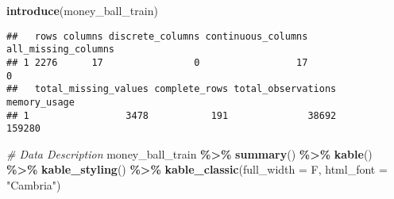 \documentclass[
]{article}
\newenvironment{Shaded}{\begin{snugshade}}{\end{snugshade}}
\newcommand{\AttributeTok}[1]{\textcolor[rgb]{0.13,0.29,0.53}{#1}}
\newcommand{\CommentTok}[1]{\textcolor[rgb]{0.56,0.35,0.01}{\textit{#1}}}
\newcommand{\FunctionTok}[1]{\textcolor[rgb]{0.13,0.29,0.53}{\textbf{#1}}}
\newcommand{\NormalTok}[1]{#1}
\newcommand{\SpecialCharTok}[1]{\textcolor[rgb]{0.81,0.36,0.00}{\textbf{#1}}}
\newcommand{\StringTok}[1]{\textcolor[rgb]{0.31,0.60,0.02}{#1}}
\begin{document}
\begin{Shaded}
\begin{Highlighting}[]
\FunctionTok{introduce}\NormalTok{(money\_ball\_train)}
\end{Highlighting}
\end{Shaded}

\begin{verbatim}
##   rows columns discrete_columns continuous_columns all_missing_columns
## 1 2276      17                0                 17                   0
##   total_missing_values complete_rows total_observations memory_usage
## 1                 3478           191              38692       159280
\end{verbatim}

\begin{Shaded}
\begin{Highlighting}[]
\CommentTok{\# Data Description }
\NormalTok{money\_ball\_train }\SpecialCharTok{\%\textgreater{}\%} 
  \FunctionTok{summary}\NormalTok{() }\SpecialCharTok{\%\textgreater{}\%}
  \FunctionTok{kable}\NormalTok{() }\SpecialCharTok{\%\textgreater{}\%} \FunctionTok{kable\_styling}\NormalTok{() }\SpecialCharTok{\%\textgreater{}\%}  \FunctionTok{kable\_classic}\NormalTok{(}\AttributeTok{full\_width =}\NormalTok{ F, }\AttributeTok{html\_font =} \StringTok{"Cambria"}\NormalTok{)}
\end{Highlighting}
\end{Shaded}
\end{document}
